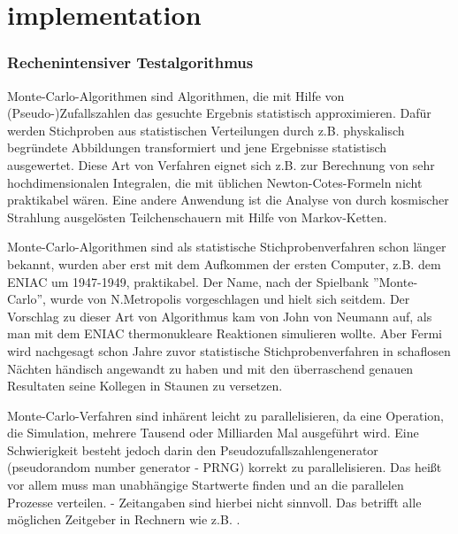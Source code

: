
\chapter{implementation}
\label{sct:implementation}


\subsection{Rechenintensiver Testalgorithmus}
\label{sct:montecarloalgo}

Monte-Carlo-Algorithmen sind Algorithmen, die mit Hilfe von (Pseudo-)Zufallszahlen das gesuchte Ergebnis statistisch approximieren. Dafür werden Stichproben aus statistischen Verteilungen durch z.B. physkalisch begründete Abbildungen transformiert und jene Ergebnisse statistisch ausgewertet. Diese Art von Verfahren eignet sich z.B. zur Berechnung von sehr hochdimensionalen Integralen, die mit üblichen Newton-Cotes-Formeln nicht praktikabel wären. Eine andere Anwendung ist die Analyse von durch kosmischer Strahlung ausgelösten Teilchenschauern mit Hilfe von Markov-Ketten\cite{metropolis1949monte}.

Monte-Carlo-Algorithmen sind als statistische Stichprobenverfahren schon länger bekannt, wurden aber erst mit dem Aufkommen der ersten Computer, z.B. dem ENIAC um 1947-1949, praktikabel\cite{metropolis1987beginning}. Der Name, nach der Spielbank ''Monte-Carlo'', wurde von N.Metropolis vorgeschlagen und hielt sich seitdem. Der Vorschlag zu dieser Art von Algorithmus kam von John von Neumann auf, als man mit dem ENIAC thermonukleare Reaktionen simulieren wollte. Aber Fermi wird nachgesagt schon Jahre zuvor statistische Stichprobenverfahren in schaflosen Nächten händisch angewandt zu haben und mit den überraschend genauen Resultaten seine Kollegen in Staunen zu versetzen.

Monte-Carlo-Verfahren sind inhärent leicht zu parallelisieren, da eine Operation, die Simulation, mehrere Tausend oder Milliarden Mal ausgeführt wird. Eine Schwierigkeit besteht jedoch darin den Pseudozufallszahlengenerator (pseudorandom number generator - PRNG) korrekt zu parallelisieren. Das heißt vor allem muss man unabhängige Startwerte finden und an die parallelen Prozesse verteilen.
 - Zeitangaben sind hierbei nicht sinnvoll. Das betrifft alle möglichen Zeitgeber in Rechnern wie z.B. .


